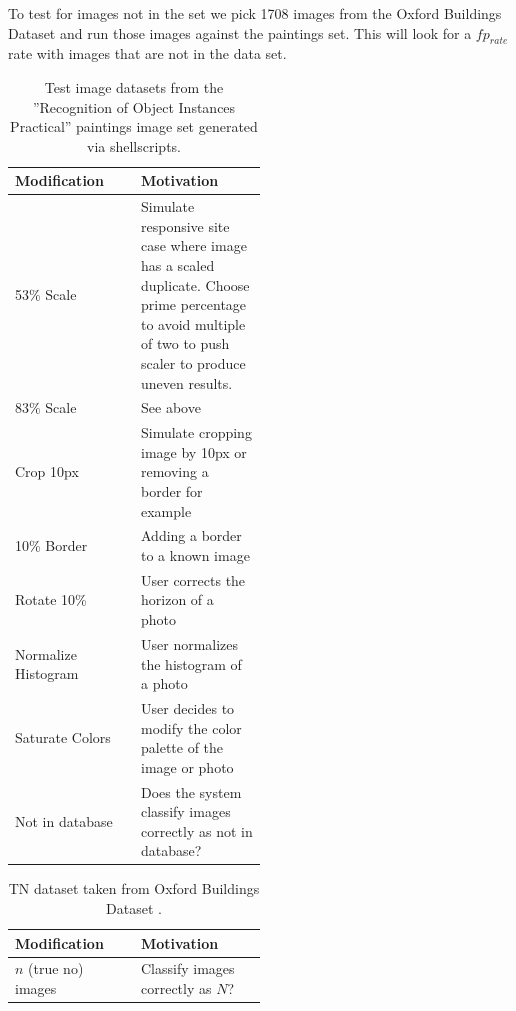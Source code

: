 \documentclass[english,12pt,a4paper,pdftex,elec,utf8]{aaltothesis}
\begin{document}
To test for images not in the set we pick 1708 images from the Oxford Buildings Dataset \cite{PhilbinJamesArandjelovicReljaZisserman2012} and run those images against the paintings set. This will look for a $fp_{rate}$ rate with images that are not in the data set.

\def\arraystretch{1.5}
\begin{table}[htb]
\caption{Test image datasets from the ''Recognition of Object Instances Practical'' \cite{Vedaldi2012} paintings image set generated via shellscripts. }
\label{modifiedimages}
\begin{center}
\begin{tabular}{lp{0.5\linewidth}}
  Modification & Motivation \\
  \hline \hline
  53\% Scale& Simulate responsive site case where image has a scaled duplicate. Choose prime percentage to avoid multiple of two to push scaler to produce uneven results.\\
  \hline
  83\% Scale& See above \\
  \hline
  Crop 10px & Simulate cropping image by 10px or removing a border for example\\
  \hline
  10\% Border & Adding a border to a known image \\
  \hline
  Rotate 10\% & User corrects the horizon of a photo \\
  \hline
  Normalize Histogram & User normalizes the histogram of a photo\\
  \hline
  Saturate Colors & User decides to modify the color palette of the image or photo\\
  \hline
  Not in database & Does the system classify images correctly as not in database?\\
\end{tabular}
\end{center}\end{table}

\def\arraystretch{1.5}
\begin{table}[htb]
\caption{TN dataset taken from Oxford Buildings Dataset \cite{PhilbinJamesArandjelovicReljaZisserman2012}.}
\label{truenegatives}
\begin{center}
\begin{tabular}{lp{0.5\linewidth}}
  Modification & Motivation \\
  \hline \hline
  $n$ (true no) images  & Classify images correctly as $N$?\\
\end{tabular}
\end{center}\end{table}
\end{document}
